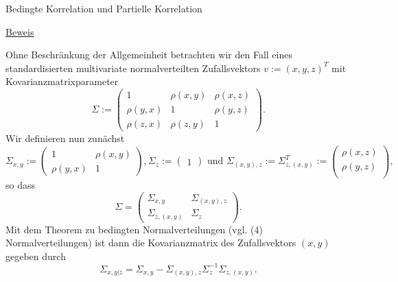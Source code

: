 \documentclass[
  8pt,
  ignorenonframetext,
]{beamer}
\begin{document}
\begin{frame}{Bedingte Korrelation und Partielle Korrelation}
\protect\hypertarget{bedingte-korrelation-und-partielle-korrelation-10}{}
\footnotesize

\underline{Beweis}

Ohne Beschränkung der Allgemeinheit betrachten wir den Fall eines
standardisierten multivariate normalverteilten Zufallsvektors
\(v := (x,y,z)^T\) mit Kovarianzmatrixparameter \begin{equation}
\Sigma := 
\begin{pmatrix}
1         & \rho(x,y) & \rho(x,z) \\
\rho(y,x) & 1         & \rho(y,z) \\
\rho(z,x) & \rho(z,y) & 1
\end{pmatrix}.
\end{equation} Wir definieren nun zunächst \begin{equation}
\Sigma_{x,y}
:=
\begin{pmatrix} 
1         & \rho(x,y) \\
\rho(y,x) & 1
\end{pmatrix},
\Sigma_{z}
:=
\begin{pmatrix} 
1
\end{pmatrix}
\mbox{ und }
\Sigma_{(x,y),z} := \Sigma_{z, (x,y)}^T :=
\begin{pmatrix}
\rho(x,z) \\
\rho(y,z) \\
\end{pmatrix},
\end{equation} so dass \begin{equation}
\Sigma =
\begin{pmatrix}
\Sigma_{x,y}      & \Sigma_{(x,y),z} \\
\Sigma_{z, (x,y)} & \Sigma_{z}
\end{pmatrix}.
\end{equation} Mit dem Theorem zu bedingten Normalverteilungen (vgl. (4)
Normalverteilungen) ist dann die Kovarianzmatrix des Zufallsvektors
\((x,y)\) gegeben durch \begin{equation}
\Sigma_{x,y|z}
= \Sigma_{x,y} - \Sigma_{(x,y),z}\Sigma_{z}^{-1}\Sigma_{z,(x,y)}.
\end{equation}
\end{frame}
\end{document}
